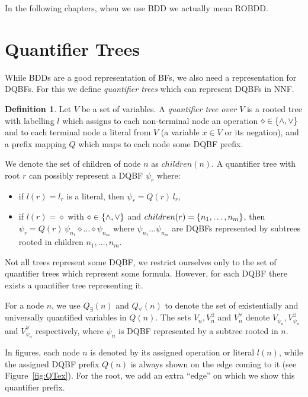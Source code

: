 \documentclass[
  digital, %
  color,
  twoside, %
  table,   %
  nolof,     %
  nolot,     %
]{fithesis3}
\let\setbuilder\set
\newcommand{\simpleset}[1]{\{{#1}\}}
\renewcommand{\set}[1]{\normalexpandarg\IfSubStr{#1}{|}{\setbuilder{#1}}{\simpleset{#1}}}
\theoremstyle{definition}
\newtheorem{definition}{Definition}
\theoremstyle{remark}
\newcommand{\vars}[1]{V_{#1}}
\newcommand{\evars}[1]{V_{#1}^{\exists}}
\newcommand{\uvars}[1]{V_{#1}^{\forall}}
\newcommand{\itholds}{\,}
\newcommand{\qtlabel}[1]{l({#1})}
\newcommand{\prefix}[1]{Q({#1})}
\newcommand{\eprefix}[1]{Q_{\exists}(#1)}
\newcommand{\uprefix}[1]{Q_{\forall}(#1)}
\newcommand{\children}[1]{children({#1})}
\begin{document}
In the following chapters, when we use BDD we actually mean ROBDD.


\section{Quantifier Trees}
\label{sec:QT}
While BDDs are a good representation of BFs, we also need a representation for DQBFs. For this we define \emph{quantifier trees} which can represent DQBFs in NNF.

\begin{definition}
  Let $V$ be a set of variables. A \emph{quantifier tree} \emph{over $V$} is a rooted tree with labelling $l$ which assigns to each non-terminal node an operation ${\diamond} \in \set{{\land},{\lor}}$ and to each terminal node a literal from $V$ (a variable $x \in V$ or its negation), and a prefix mapping $Q$ which maps to each node some DQBF prefix.
\end{definition}

We denote the set of children of node $n$ as $\children{n}$.  A quantifier tree with root $r$ can possibly represent a DQBF $\psi_r$ where:
\begin{itemize}
    \item if $\qtlabel{r} = l_r$ is a literal, then $\psi_r = \prefix{r} \itholds l_r$,
    \item if $\qtlabel{r} = {\diamond}$ with ${\diamond} \in \set{{\land},{\lor}}$ and $\children{r} = \set{n_1,\dots, n_m}$, then $\psi_r = \prefix{r} \itholds \psi_{n_1} \diamond \dots \diamond \psi_{n_m}$ where $\psi_{n_1} \dots \psi_{n_m}$ are DQBFs represented by subtrees rooted in children $n_1,\dots,n_m$.
\end{itemize}
Not all trees represent some DQBF, we restrict ourselves only to the set of quantifier trees which represent some formula. However, for each DQBF there exists a quantifier tree representing it.

For a node $n$, we use $\eprefix{n}$ and $\uprefix{n}$ to denote the set of existentially and universally quantified variables in $\prefix{n}$. The sets $\vars{n}, \evars{n}$ and $\uvars{n}$ denote $\vars{\psi_n}, \evars{\psi_n}$ and $\uvars{\psi_n}$ respectively, where $\psi_n$ is DQBF represented by a subtree rooted in $n$.

In figures, each node $n$ is denoted by its assigned operation or literal $\qtlabel{n}$, while the assigned DQBF prefix $\prefix{n}$ is always shown on the edge coming to it (see Figure~\ref{fig:QTex}). For the root, we add an extra ``edge'' on which we show this quantifier prefix.
\end{document}
